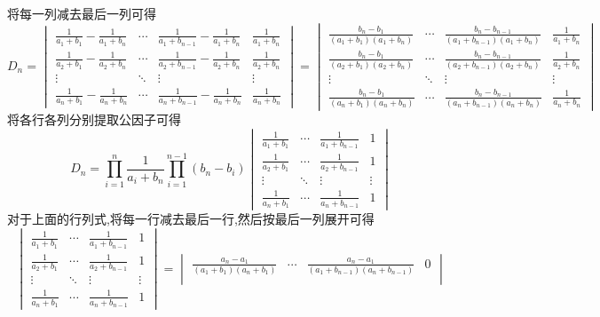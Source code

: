 \documentclass{ctexart}
\begin{document}
\begin{solution}
    将每一列减去最后一列可得
    \[D_n=\begin{vmatrix}
        \frac{1}{a_1+b_1}-\frac{1}{a_1+b_n}&\cdots&\frac{1}{a_1+b_{n-1}}-\frac{1}{a_1+b_n}&\frac{1}{a_1+b_n}\\
        \frac{1}{a_2+b_1}-\frac{1}{a_2+b_n}&\cdots&\frac{1}{a_2+b_{n-1}}-\frac{1}{a_2+b_n}&\frac{1}{a_2+b_n}\\
        \vdots&\ddots&\vdots&\vdots\\
        \frac{1}{a_n+b_1}-\frac{1}{a_n+b_n}&\cdots&\frac{1}{a_n+b_{n-1}}-\frac{1}{a_n+b_n}&\frac{1}{a_n+b_n}
    \end{vmatrix}=\begin{vmatrix}
        \frac{b_n-b_1}{\left(a_1+b_1\right)\left(a_1+b_n\right)}&\cdots&\frac{b_n-b_{n-1}}{\left(a_1+b_{n-1}\right)\left(a_1+b_n\right)}&\frac{1}{a_1+b_n}\\
        \frac{b_n-b_1}{\left(a_2+b_1\right)\left(a_2+b_n\right)}&\cdots&\frac{b_n-b_{n-1}}{\left(a_2+b_{n-1}\right)\left(a_2+b_n\right)}&\frac{1}{a_2+b_n}\\
        \vdots&\ddots&\vdots&\vdots\\
        \frac{b_n-b_1}{\left(a_n+b_1\right)\left(a_n+b_n\right)}&\cdots&\frac{b_n-b_{n-1}}{\left(a_n+b_{n-1}\right)\left(a_n+b_n\right)}&\frac{1}{a_n+b_n}
    \end{vmatrix}\]
    将各行各列分别提取公因子可得
    \[D_n=\prod_{i=1}^{n}\dfrac{1}{a_i+b_n}\prod_{i=1}^{n-1}\left(b_n-b_i\right)\begin{vmatrix}
        \frac{1}{a_1+b_1}&\cdots&\frac{1}{a_1+b_{n-1}}&1\\
        \frac{1}{a_2+b_1}&\cdots&\frac{1}{a_2+b_{n-1}}&1\\
        \vdots&\ddots&\vdots&\vdots\\
        \frac{1}{a_n+b_1}&\cdots&\frac{1}{a_n+b_{n-1}}&1
    \end{vmatrix}\]
    对于上面的行列式,将每一行减去最后一行,然后按最后一列展开可得
    \[\begin{vmatrix}
        \frac{1}{a_1+b_1}&\cdots&\frac{1}{a_1+b_{n-1}}&1\\
        \frac{1}{a_2+b_1}&\cdots&\frac{1}{a_2+b_{n-1}}&1\\
        \vdots&\ddots&\vdots&\vdots\\
        \frac{1}{a_n+b_1}&\cdots&\frac{1}{a_n+b_{n-1}}&1
    \end{vmatrix}=\begin{vmatrix}
        \frac{a_n-a_1}{\left(a_1+b_1\right)\left(a_n+b_1\right)}&\cdots&\frac{a_n-a_1}{\left(a_1+b_{n-1}\right)\left(a_n+b_{n-1}\right)}&0\\

\end{vmatrix}\]
\end{solution}
\end{document}
